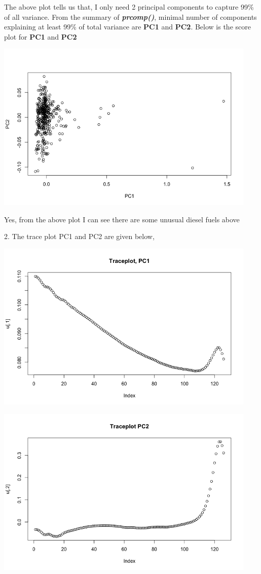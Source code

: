 \documentclass[a4paper,10pt]{article}
\begin{document}
The above plot tells us that, I only need 2 principal components to capture 99\% of all variance.
From the summary of \textbf{\textit{prcomp()}},
minimal number of components explaining at least 99\% of total variance are \textbf{PC1} and \textbf{PC2}. Below is the 
score plot for \textbf{PC1} and \textbf{PC2}
\begin{center}
  \includegraphics[width=125mm,scale=0.10]{PC1_PC2_Plot.png} 
\end{center}
Yes, from the above plot I can see there are some unusual diesel fuels above \par
2. The trace plot PC1 and PC2 are given below, \par
\begin{center}
    \includegraphics[width=125mm,scale=0.10]{Traceplot_PC1.png} \par
    \includegraphics[width=125mm,scale=0.10]{Traceplot_PC2.png}
\end{center} \par
\end{document}

